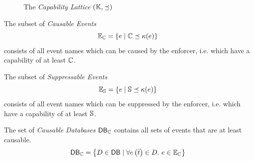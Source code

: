\begin{figure}
    
    \centering
    \caption{The \emph{Capability Lattice} $(\mathbb{K}, \preceq)$
    \label{fig:capability-lattice}}
\end{figure}

\begin{definition}
    \label{def:cau-events}
    The subset of \emph{Causable Events}
    $$
    \mathbb{E}_{\mathbb{C}} =
    \left\lbrace e \mid \mathbb{C} \preceq \kappa(e) \right\rbrace
    $$
    consists of all event names which can be caused by the enforcer,
    i.e. which have a capability of at least $\mathbb{C}$.
\end{definition}

\begin{definition}
    \label{def:sup-events}
    The subset of \emph{Suppressable Events}
    $$
    \mathbb{E}_{\mathbb{S}} =
    \left\lbrace e \mid \mathbb{S} \preceq \kappa(e) \right\rbrace
    $$
    consists of all event names which can be suppressed by the enforcer, 
    i.e. which have a capability of at least $\mathbb{S}$.
\end{definition}

\begin{definition}
    \label{def:cau-databases}
    The set of \emph{Causable Databases} $\mathsf{DB}_{\mathbb{C}}$ contains all
    sets of events that are at least causable.
    $$
        \mathsf{DB}_{\mathbb{C}} =
        \left\{
        D \in \mathsf{DB} \mid
        \forall e\left( \bar{t} \right) \in D. \ e \in \mathbb{E}_{\mathbb{C}}
        \right\}
    $$
\end{definition}

